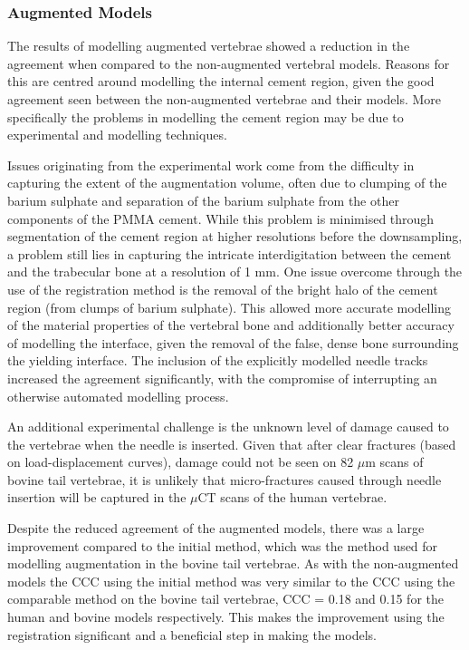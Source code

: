 \subsubsection{Augmented Models}

The results of modelling augmented vertebrae showed a reduction in the
agreement when compared to the non-augmented vertebral models.  Reasons for
this are centred around modelling the internal cement region, given the good
agreement seen between the non-augmented vertebrae and their models.  More
specifically the problems in modelling the cement region may be
due to experimental and modelling techniques.  

Issues originating from the
experimental work come from the difficulty in capturing the extent of the
augmentation volume, often due to clumping of the barium sulphate and
separation of the barium sulphate from the other components of the PMMA cement.
While this problem is minimised through segmentation of the cement region at
higher resolutions before the downsampling, a problem still lies in capturing
the intricate interdigitation between the cement and the trabecular bone at a
resolution of 1 mm.  One issue overcome through the use of the registration
method is the removal of the bright halo of the cement region (from clumps of barium sulphate). This allowed more accurate modelling of the material properties of the vertebral bone and additionally better accuracy of modelling the interface, given the removal of the false, dense bone surrounding the yielding interface. The inclusion of the explicitly modelled needle tracks increased the agreement significantly, with the compromise of interrupting an otherwise automated modelling process.

An additional experimental challenge is the unknown level
of damage caused to the vertebrae when the needle is inserted.  Given that
after clear fractures (based on load-displacement curves), damage could not be
seen on 82 $\mu$m scans of bovine tail vertebrae, it is unlikely that micro-fractures
caused through needle insertion will be captured in the $\mu$CT scans of the
human vertebrae.

Despite the reduced agreement of the augmented models, there was a large
improvement compared to the initial method, which was the method used for
modelling augmentation in the bovine tail vertebrae.  As with the non-augmented
models the CCC using the initial method was very similar to the CCC using the
comparable method on the bovine tail vertebrae, CCC = 0.18 and 0.15 for the
human and bovine models respectively.  This makes the improvement using the
registration significant and a beneficial step in making the models.

